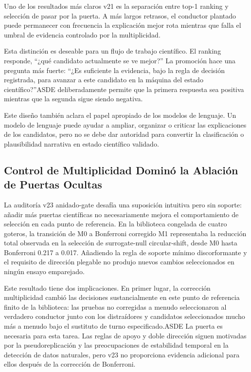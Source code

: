 \documentclass{ieeeaccess}
\begin{document}
Uno de los resultados más claros v21 es la separación entre top-1 ranking y selección de pasar por la puerta. A más largos retrasos, el conductor plantado puede permanecer con frecuencia la explicación mejor rota mientras que falla el umbral de evidencia controlado por la multiplicidad.

Esta distinción es deseable para un flujo de trabajo científico. El ranking responde, ``¿qué candidato actualmente se ve mejor?'' La promoción hace una pregunta más fuerte: ``¿Es suficiente la evidencia, bajo la regla de decisión registrada, para avanzar a este candidato en la máquina del estado científico?''ASDE deliberadamente permite que la primera respuesta sea positiva mientras que la segunda sigue siendo negativa.

Este diseño también aclara el papel apropiado de los modelos de lenguaje. Un modelo de lenguaje puede ayudar a ampliar, organizar o criticar las explicaciones de los candidatos, pero no se debe dar autoridad para convertir la clasificación o plausibilidad narrativa en estado científico validado.

\subsection{Control de Multiplicidad Dominó la Ablación de Puertas Ocultas}\label{control-de-multiplicidad-dominuxf3-la-ablaciuxf3n-de-puertas-ocultas}

La auditoría v23 anidado-gate desafía una suposición intuitiva pero sin soporte: añadir más puertas científicas no necesariamente mejora el comportamiento de selección en cada punto de referencia. En la biblioteca congelada de cuatro goteros, la transición de M0 a Bonferroni corregido M1 representaba la reducción total observada en la selección de surrogate-null circular-shift, desde M0 hasta Bonferroni 0.217 a 0.017. Añadiendo la regla de soporte mínimo discorformante y el requisito de dirección plegable no produjo nuevos cambios seleccionados en ningún ensayo emparejado.

Este resultado tiene dos implicaciones. En primer lugar, la corrección multiplicidad cambió las decisiones sustancialmente en este punto de referencia finito de la biblioteca: las pruebas no corregidas a menudo seleccionaron al verdadero conductor junto con los distraídores y candidatos seleccionados mucho más a menudo bajo el sustituto de turno especificado.ASDE La puerta es necesaria para esta tarea. Las reglas de apoyo y doble dirección siguen motivadas por la pseudoreplicación y las preocupaciones de estabilidad temporal en la detección de datos naturales, pero v23 no proporciona evidencia adicional para ellos después de la corrección de Bonferroni.
\end{document}
